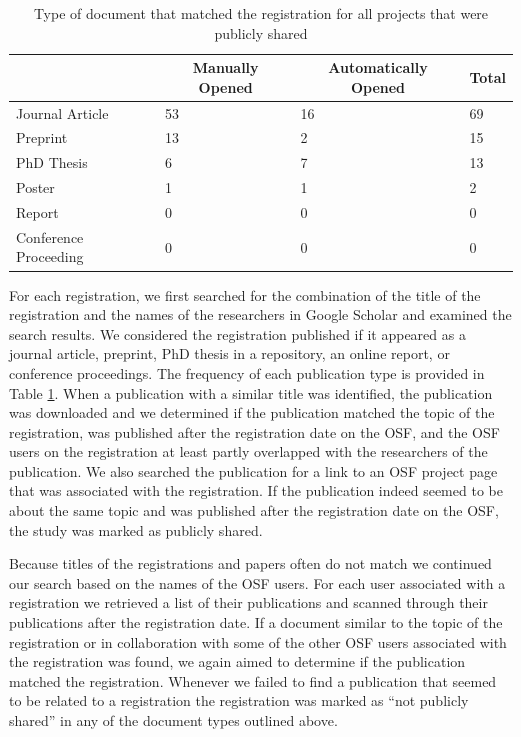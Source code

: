 \documentclass[
  ,man, a4paper,floatsintext]{apa6}
\begin{document}
\begin{table}[tbp]

\begin{center}
\begin{threeparttable}

\caption{\label{tab:publicationtype}Type of document that matched the registration for all projects that were publicly shared}

\begin{tabular}{llll}
\toprule
 & \multicolumn{1}{c}{Manually Opened} & \multicolumn{1}{c}{Automatically Opened} & \multicolumn{1}{c}{Total}\\
\midrule
Journal Article & 53 & 16 & 69\\
Preprint & 13 & 2 & 15\\
PhD Thesis & 6 & 7 & 13\\
Poster & 1 & 1 & 2\\
Report & 0 & 0 & 0\\
Conference Proceeding & 0 & 0 & 0\\
\bottomrule
\end{tabular}

\end{threeparttable}
\end{center}

\end{table}

For each registration, we first searched for the combination of the title of the registration and the names of the researchers in Google Scholar and examined the search results. We considered the registration published if it appeared as a journal article, preprint, PhD thesis in a repository, an online report, or conference proceedings. The frequency of each publication type is provided in Table \ref{tab:publicationtype}. When a publication with a similar title was identified, the publication was downloaded and we determined if the publication matched the topic of the registration, was published after the registration date on the OSF, and the OSF users on the registration at least partly overlapped with the researchers of the publication. We also searched the publication for a link to an OSF project page that was associated with the registration. If the publication indeed seemed to be about the same topic and was published after the registration date on the OSF, the study was marked as publicly shared.

Because titles of the registrations and papers often do not match we continued our search based on the names of the OSF users. For each user associated with a registration we retrieved a list of their publications and scanned through their publications after the registration date. If a document similar to the topic of the registration or in collaboration with some of the other OSF users associated with the registration was found, we again aimed to determine if the publication matched the registration. Whenever we failed to find a publication that seemed to be related to a registration the registration was marked as ``not publicly shared'' in any of the document types outlined above.
\end{document}
